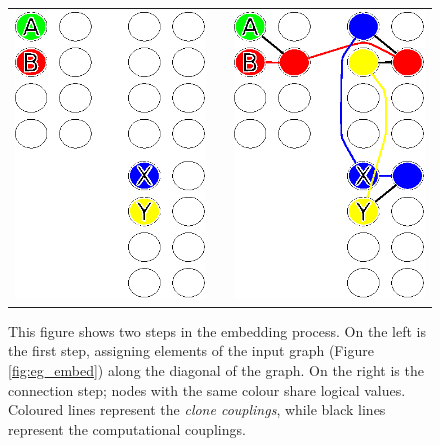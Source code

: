 \begin{figure}
	\begin{tabular}{l l l}
		\includegraphics{img/eg_embed_full.eps} & \hspace{1 in} &\includegraphics{img/eg_embed_full2.eps} \\
	\end{tabular}
	\caption[Embedding Algorithm]{This figure shows two steps in the embedding process.  On the left is the first step, assigning elements of the input graph (Figure \ref{fig:eg_embed}) along the diagonal of the \machine graph.  On the right is the connection step; nodes with the same colour share logical values.  Coloured lines represent the \emph{clone couplings}, while black lines represent the computational couplings.}
	\label{fig:embedding}
\end{figure}

